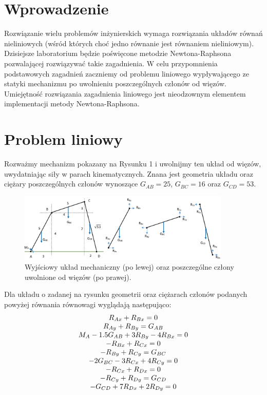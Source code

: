 \documentclass{instrukcja}
\begin{document}
\author{B. Górecki}
\materialtitle

\section*{Wprowadzenie}

Rozwiązanie wielu problemów inżynierskich wymaga rozwiązania układów równań nieliniowych (wśród których choć jedno równanie jest równaniem nieliniowym). Dzisiejsze laboratorium będzie poświęcone metodzie Newtona-Raphsona pozwalającej rozwiązywać takie zagadnienia. W celu przypomnienia podstawowych zagadnień zaczniemy od problemu liniowego wypływającego ze statyki mechanizmu po uwolnieniu poszczególnych członów od więzów. Umiejętność rozwiązania zagadnienia liniowego jest nieodzownym elementem implementacji metody Newtona-Raphsona.

\section{Problem liniowy}
Rozważmy mechanizm pokazany na Rysunku 1 i uwolnijmy ten układ od więzów, uwydatniając siły w parach kinematycznych. Znana jest geometria układu oraz ciężary poszczególnych członów wynoszące $G_{AB}=25$, $G_{BC}=16$ oraz $G_{CD}=53$.

\begin{figure}[h]
\centering
\includegraphics[width=0.9\textwidth]{mechanizm.png}
\caption[c]{Wyjściowy układ mechaniczny (po lewej) oraz poszczególne człony uwolnione od więzów (po prawej).}
\end{figure}

Dla układu o zadanej na rysunku geometrii oraz ciężarach członów podanych powyżej równania równowagi wyglądają następująco:
\begin{displaymath}
\begin{tabular}{c}
$R_{Ax}+R_{Bx} = 0$ \\
$R_{Ay}+R_{By} = G_{AB}$ \\
$M_A-1.5G_{AB}+3R_{By}-4R_{Bx}=0$ \\
$-R_{Bx}+R_{Cx}=0$ \\
$-R_{By}+R_{Cy}=G_{BC}$ \\
$-2G_{BC}-3R_{Cx}+4R_{Cy}=0$ \\
$-R_{Cx}+R_{Dx}=0$ \\
$-R_{Cy}+R_{Dy}=G_{CD}$ \\
$-G_{CD}+7R_{Dx}+2R_{Dy}=0$ \\
\end{tabular}
\end{displaymath}
\end{document}
